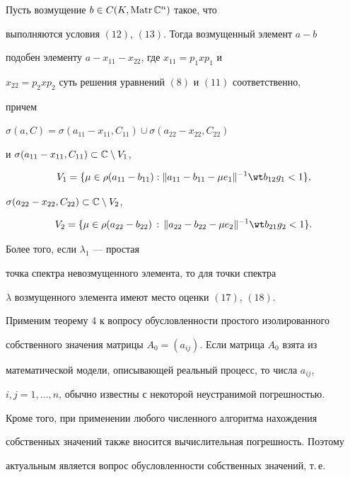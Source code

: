 \begin{thm}


Пусть возмущение $b\in C(K,\operatorname{Matr}\Bbb{C}^n)$ такое, что


выполняются условия $(12)$, $(13)$. Тогда возмущенный элемент $a-b$


подобен элементу $a-x_{11}-x_{22}$, где $x_{11}=p_1xp_1$ и


$x_{22}=p_2xp_2$ суть решения уравнений $(8)$ и $(11)$ соответственно,


причем


$\sigma(a,C)=\sigma(a_{11}-x_{11},C_{11})\cup\sigma(a_{22}-x_{22},C_{22})$


и $\sigma(a_{11}-x_{11},C_{11})\subset\Bbb{C}\setminus V_1$,


$$


V_1=\{\mu\in\rho(a_{11}-b_{11}):\|a_{11}-b_{11}-\mu e_1\|^{-1}


\wt b_{12}g_1<1\},


$$


$\sigma(a_{22}-x_{22},C_{22})\subset\Bbb{C}\setminus V_2$,


$$


V_2=\{\mu\in\rho(a_{22}-b_{22})\,:\,\|a_{22}-b_{22}-\mu e_2\|^{-1}


\wt b_{21}g_2<1\}.


$$


Более того, если $\lambda_1$ --- простая


точка спектра невозмущенного элемента, то для точки спектра


$\lambda$ возмущенного элемента имеют место оценки $(17)$, $(18)$.


\end{thm}





Применим теорему 4 к вопросу обусловленности простого изолированного


собственного значения матрицы $A_0=(a_{ij})$. Если матрица $A_0$ взята из


математической модели, описывающей реальный процесс, то числа $a_{ij}$,


$i,j=1,\dotsc,n$, обычно известны с некоторой неустранимой погрешностью. 


Кроме того, при применении любого численного алгоритма нахождения 


собственных значений также вносится вычислительная погрешность. Поэтому 


актуальным является вопрос обусловленности собственных значений, т.\,е. 


